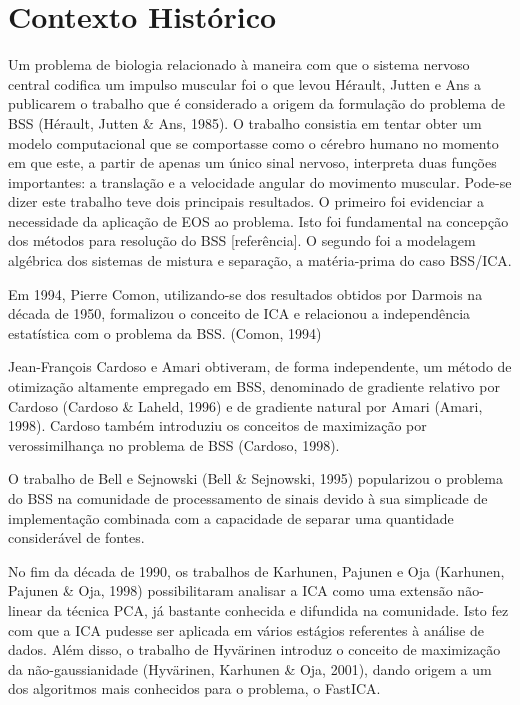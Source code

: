 
\section{Contexto Histórico}

    Um problema de biologia relacionado à maneira com que o sistema nervoso central codifica um impulso muscular foi o que levou Hérault, Jutten e Ans a publicarem o trabalho que é considerado a origem da formulação do problema de BSS (Hérault, Jutten \& Ans, 1985). O trabalho consistia em tentar obter um modelo computacional que se comportasse como o cérebro humano no momento em que este, a partir de apenas um único sinal nervoso, interpreta duas funções importantes: a translação e a velocidade angular do movimento muscular. Pode-se dizer este trabalho teve dois principais resultados. O primeiro foi evidenciar a necessidade da aplicação de EOS ao problema. Isto foi fundamental na concepção dos métodos para resolução do BSS [referência]. O segundo foi a modelagem algébrica dos sistemas de mistura e separação, a matéria-prima do caso BSS/ICA.


    Em 1994, Pierre Comon, utilizando-se dos resultados obtidos por Darmois na década de 1950, formalizou o conceito de ICA e relacionou a independência estatística com o problema da BSS. (Comon, 1994)
    
    
    Jean-François Cardoso e Amari obtiveram, de forma independente, um método de otimização altamente empregado em BSS, denominado de gradiente relativo por Cardoso (Cardoso \& Laheld, 1996) e de gradiente natural por Amari (Amari, 1998). Cardoso também introduziu os conceitos de maximização por verossimilhança no problema de BSS (Cardoso, 1998).
    
    
    O trabalho de Bell e Sejnowski (Bell \& Sejnowski, 1995) popularizou o problema do BSS na comunidade de processamento de sinais devido à sua simplicade de implementação combinada com a capacidade de separar uma quantidade considerável de fontes.
    
    No fim da década de 1990, os trabalhos de Karhunen, Pajunen e Oja  (Karhunen, Pajunen \& Oja, 1998) possibilitaram analisar a ICA como uma extensão não-linear da técnica PCA, já bastante conhecida e difundida na comunidade. Isto fez com que a ICA pudesse ser aplicada em vários estágios referentes à análise de dados. Além disso,  o trabalho de  Hyvärinen introduz o conceito de maximização da não-gaussianidade (Hyvärinen, Karhunen \& Oja, 2001), dando origem a um dos algoritmos mais conhecidos para o problema, o FastICA.
    
